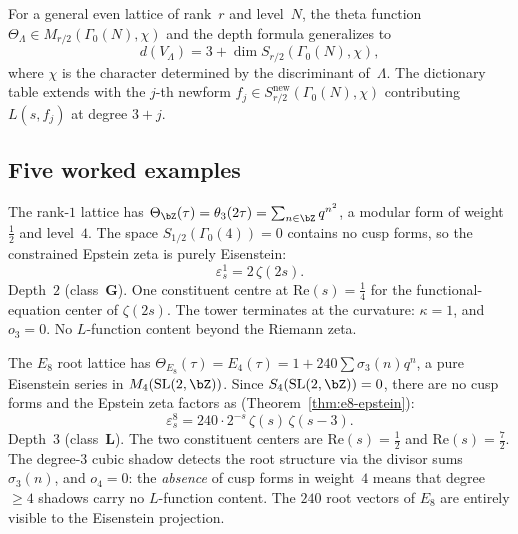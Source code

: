 \begin{remark}
\label{rem:depth-non-unimodular}
For a general even lattice of rank~$r$ and level~$N$, the
theta function $\Theta_\Lambda \in M_{r/2}(\Gamma_0(N), \chi)$
and the depth formula generalizes to
\[
 d(V_\Lambda)
 = 3 + \dim S_{r/2}(\Gamma_0(N), \chi),
\]
where $\chi$ is the character determined by the discriminant
of~$\Lambda$. The dictionary table extends with the
$j$-th newform $f_j \in S_{r/2}^{\mathrm{new}}(\Gamma_0(N),\chi)$
contributing $L(s,f_j)$ at degree $3+j$.
\end{remark}

\subsection{Five worked examples}
\label{subsec:period-shadow-examples}

\begin{computation}
\label{comp:period-shadow-vz}
\ClaimStatusProvedHere
The rank-$1$ lattice has
$\Theta_{\bZ}(\tau)=\theta_3(2\tau)=\sum_{n\in\bZ}q^{n^2}$, a
modular form of weight~$\frac12$ and level~$4$. The space
$S_{1/2}(\Gamma_0(4))=0$ contains no cusp forms, so
the constrained Epstein zeta is purely Eisenstein:
\[
 \varepsilon^1_s
 = 2\,\zeta(2s).
\]
Depth~$2$ (class~$\mathbf{G}$). One constituent centre at
$\mathrm{Re}(s)=\frac14$ for the functional-equation center of
$\zeta(2s)$. The tower terminates at
the curvature: $\kappa = 1$, and $o_3 = 0$. No $L$-function
content beyond the Riemann zeta.
\end{computation}

\begin{computation}
\label{comp:period-shadow-ve8}
\ClaimStatusProvedHere
The $E_8$ root lattice has
$\Theta_{E_8}(\tau)=E_4(\tau)=1+240\sum\sigma_3(n)q^n$,
a pure Eisenstein series in $M_4(\mathrm{SL}(2,\bZ))$. Since
$S_4(\mathrm{SL}(2,\bZ))=0$, there are no cusp forms and the
Epstein zeta factors as
(Theorem~\textup{\ref{thm:e8-epstein}}):
\[
 \varepsilon^8_s
 = 240\cdot 2^{-s}\,\zeta(s)\,\zeta(s-3).
\]
Depth~$3$ (class~$\mathbf{L}$). The two constituent centers are
$\mathrm{Re}(s)=\frac12$ and $\mathrm{Re}(s)=\frac72$.
The degree-$3$ cubic shadow detects the root structure via the
divisor sums $\sigma_3(n)$, and $o_4 = 0$: the \emph{absence} of
cusp forms in weight~$4$ means that degree~$\ge4$ shadows carry
no $L$-function content. The $240$ root vectors of $E_8$ are
entirely visible to the Eisenstein projection.
\end{computation}

